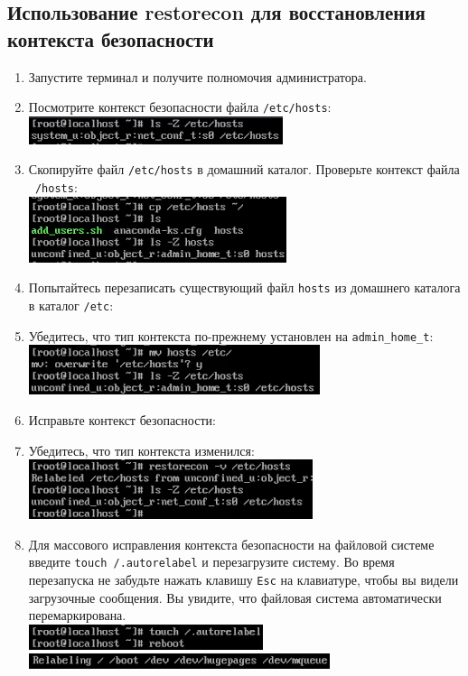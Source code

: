\documentclass[12pt]{article}
\begin{document}
\subsection{Использование restorecon для восстановления контекста безопасности}
\begin{enumerate}
	\item Запустите терминал и получите полномочия администратора.
	\item Посмотрите контекст безопасности файла \texttt{/etc/hosts}:
	      \\\includegraphics{9.png}
	\item Скопируйте файл \texttt{/etc/hosts} в домашний каталог. Проверьте контекст файла \texttt{~/hosts}:
	      \\\includegraphics{10.png}
	\item Попытайтесь перезаписать существующий файл \texttt{hosts} из домашнего каталога в каталог \texttt{/etc}:
	\item Убедитесь, что тип контекста по-прежнему установлен на \texttt{admin\_home\_t}:
	      \\\includegraphics{11.png}
	\item Исправьте контекст безопасности:
	\item Убедитесь, что тип контекста изменился:
	      \\\includegraphics{12.png}
	\item Для массового исправления контекста безопасности на файловой системе введите \texttt{touch /.autorelabel} и перезагрузите систему. Во время перезапуска не забудьте нажать клавишу \texttt{Esc} на клавиатуре, чтобы вы видели загрузочные сообщения. Вы увидите, что файловая система автоматически перемаркирована.
	      \\\includegraphics{13.png}
	      \\\includegraphics{14.png}
\end{enumerate}
\end{document}
